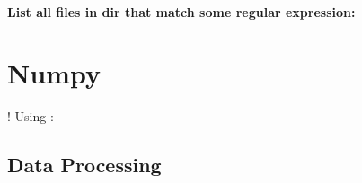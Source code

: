 \documentclass[10pt]{article}
\begin{document}
\paragraph{List all files in dir that match some regular expression:}
\begin{description}
  \setlength\itemsep{-5pt} 
  \item {}
  \item {}
\end{description}


\newpage
\section{Numpy}
! Using :

\subsection{Data Processing}
\begin{description}
  \setlength\itemsep{1pt}
  \item[Import data from csv file:] 
\end{description}
\end{document}
